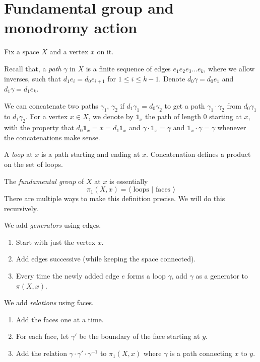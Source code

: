 \section{Fundamental group and monodromy action}
Fix a space $X$ and a vertex $x$ on it.

Recall that, a \emph{path} $\gamma$ in $X$ is a finite sequence of edges $e_1 e_2 e_3 \dots e_k$, where we allow inverses, such that $d_1 e_i = d_0 e_{i+1}$ for $1 \le i \le k-1$.
Denote $d_0 \gamma = d_0 e_1$ and $d_1 \gamma = d_1 e_k$.

We can concatenate two paths $\gamma_1$, $\gamma_2$ if $d_1 \gamma_1 = d_0 \gamma_2$ to get a path $\gamma_1 \cdot \gamma_2$ from $d_0 \gamma_1$ to $d_1 \gamma_2$.
For a vertex $x \in X$, we denote by $\mathbb{1}_x$ the path of length 0 starting at $x$, with the property that $d_0 \mathbb{1}_x = x = d_1 \mathbb{1}_x$ and $\gamma \cdot \mathbb{1}_x = \gamma$ and $ \mathbb{1}_x \cdot \gamma = \gamma$ whenever the concatenations make sense.

A \emph{loop} at $x$ is a path starting and ending at $x$. Concatenation defines a product on the set of loops.

The \emph{fundamental group} of $X$ at $x$ is essentially
\begin{equation*}
  \pi_1(X,x) = \langle \mbox{ loops } | \mbox{ faces }\rangle
\end{equation*}
There are multiple ways to make this definition precise. We will do this recursively.

We add \emph{generators} using edges.
\begin{enumerate}
  \item Start with just the vertex $x$.
  \item Add edges successive (while keeping the space connected).
  \item Every time the newly added edge $e$ forms a loop $\gamma$, add $\gamma$ as a generator to $\pi(X,x)$.
\end{enumerate}

We add \emph{relations} using faces.
\begin{enumerate}
  \item Add the faces one at a time.
  \item For each face, let $\gamma'$ be the boundary of the face starting at $y$.
  \item Add the relation $\gamma \cdot \gamma' \cdot \gamma^{-1}$ to $\pi_1(X,x)$ where $\gamma$ is a path connecting $x$ to $y$.
\end{enumerate}


